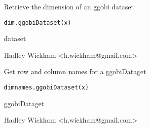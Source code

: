 \documentclass{article}
\begin{document}
\begin{Description}\relax
Retrieve the dimension of an ggobi dataset
\end{Description}
\begin{Usage}
\begin{verbatim}dim.ggobiDataset(x)\end{verbatim}
\end{Usage}
\begin{Arguments}
\begin{ldescription}
\item[\code{x}] dataset
\end{ldescription}
\end{Arguments}
\begin{Details}\relax
\end{Details}
\begin{Author}\relax
Hadley Wickham <h.wickham@gmail.com>
\end{Author}
\begin{Examples}
\begin{ExampleCode}\end{ExampleCode}
\end{Examples}

\begin{Description}\relax
Get row and column names for a ggobiDataget
\end{Description}
\begin{Usage}
\begin{verbatim}dimnames.ggobiDataset(x)\end{verbatim}
\end{Usage}
\begin{Arguments}
\begin{ldescription}
\item[\code{x}] ggobiDataget
\end{ldescription}
\end{Arguments}
\begin{Details}\relax
\end{Details}
\begin{Author}\relax
Hadley Wickham <h.wickham@gmail.com>
\end{Author}
\begin{Examples}
\begin{ExampleCode}\end{ExampleCode}
\end{Examples}
\end{document}
